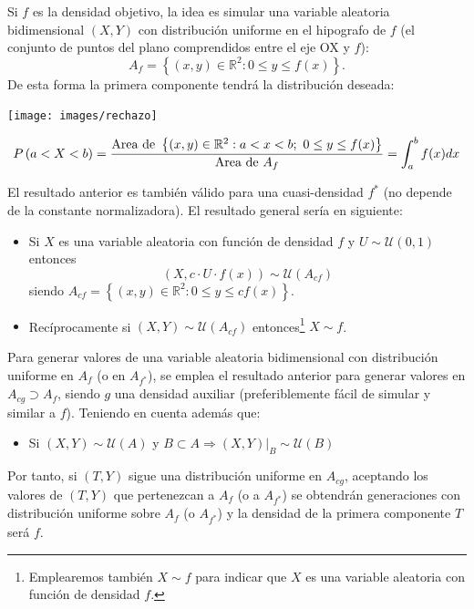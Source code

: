 \documentclass[
]{book}
\providecommand{\tightlist}{%
  \setlength{\itemsep}{0pt}\setlength{\parskip}{0pt}}
\theoremstyle{break}
\theoremstyle{definition}
\theoremstyle{definition}
\theoremstyle{definition}
\theoremstyle{definition}
\theoremstyle{remark}
\begin{document}
Si \(f\) es la densidad objetivo, la idea es simular una variable aleatoria
bidimensional \(\left( X, Y\right)\) con distribución
uniforme en el hipografo de \(f\) (el conjunto de puntos del plano
comprendidos entre el eje OX y \(f\)):
\[A_{f}=\left\{ \left( x,y\right) \in \mathbb{R}^{2}:0\leq y\leq
f(x) \right\}.\]
De esta forma la primera componente tendrá la distribución deseada:

\begin{center}\texttt{[image: images/rechazo]} \end{center}

\[ P\left( a<X<b\right) = \frac{\text{Area de }\left\{ \left( x,y\right) \in 
\mathbb{R}^{2}:a<x<b;~0\leq y\leq f(x) \right\} }{\text{Area de }
A_{f}} \\
= \int_{a}^{b}f(x) dx \]

El resultado anterior es también válido para una cuasi-densidad \(f^{\ast}\)
(no depende de la constante normalizadora).
El resultado general sería en siguiente:

\begin{itemize}
\item
  Si \(X\) es una variable aleatoria con función de densidad \(f\)
  y \(U \sim \mathcal{U}(0, 1)\) entonces
  \[\left( X,c\cdot U\cdot f(x) \right) \sim \mathcal{U}\left(
  A_{cf}\right)\]
  siendo
  \(A_{cf}=\left\{ \left( x, y \right) \in \mathbb{R}^{2} : 0 \leq y \leq cf\left( x \right) \right\}\).
\item
  Recíprocamente si \(\left( X,Y\right) \sim \mathcal{U}\left(A_{cf}\right)\) entonces\footnote{Emplearemos también \(X\sim f\) para indicar que \(X\) es una variable aleatoria con función de densidad \(f\).} \(X\sim f\).
\end{itemize}

Para generar valores de una variable aleatoria bidimensional con distribución uniforme
en \(A_{f}\) (o en \(A_{f^{\ast }}\)), se emplea el resultado anterior para
generar valores en \(A_{cg} \supset A_{f}\), siendo \(g\) una densidad auxiliar
(preferiblemente fácil de simular y similar a \(f\)).
Teniendo en cuenta además que:

\begin{itemize}
\tightlist
\item
  Si \(\left( X,Y\right) \sim \mathcal{U}\left( A\right)\) y
  \(B \subset A\Rightarrow \left. \left( X,Y\right) \right\vert _{B} \sim \mathcal{U}\left(B\right)\)
\end{itemize}

Por tanto, si \(\left( T, Y \right)\) sigue una distribución
uniforme en \(A_{cg}\), aceptando los valores de
\(\left( T, Y\right)\) que pertenezcan a \(A_{f}\) (o a \(A_{f^{\ast }}\)) se obtendrán
generaciones con distribución uniforme sobre \(A_{f}\) (o \(A_{f^{\ast }}\))
y la densidad de la primera componente \(T\) será \(f\).
\end{document}
